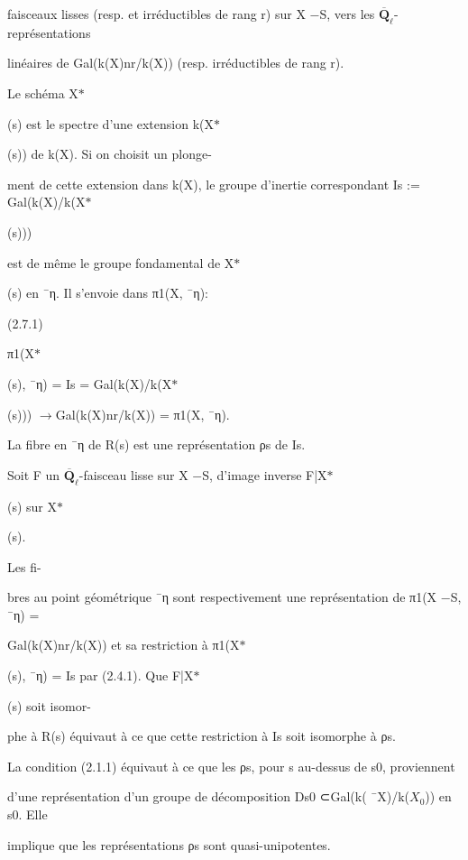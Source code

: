 \documentclass[11pt]{article}
\begin{document}
\noindent faisceaux lisses (resp. et irréductibles de rang r) sur X −S, vers les \(\overline{\mathbf Q}_{\ell}\)-représentations\par
\noindent linéaires de Gal(k(X)nr/k(X)) (resp. irréductibles de rang r).\par
\noindent Le schéma X\(*\)\par
\noindent (s) est le spectre d’une extension k(X\(*\)\par
\noindent (s)) de k(X). Si on choisit un plonge-\par
\noindent ment de cette extension dans k(X), le groupe d’inertie correspondant Is := Gal(k(X)/k(X\(*\)\par
\noindent (s)))\par
\noindent est de même le groupe fondamental de X\(*\)\par
\noindent (s) en ¯η. Il s’envoie dans π1(X, ¯η):\par
\noindent (2.7.1)\par
\noindent π1(X\(*\)\par
\noindent (s), ¯η) = Is = Gal(k(X)/k(X\(*\)\par
\noindent (s))) \(\to\)Gal(k(X)nr/k(X)) = π1(X, ¯η).\par
\noindent La fibre en ¯η de R(s) est une représentation ρs de Is.\par
\noindent Soit F un \(\overline{\mathbf Q}_{\ell}\)-faisceau lisse sur X −S, d’image inverse F|X\(*\)\par
\noindent (s) sur X\(*\)\par
\noindent (s).\par
\noindent Les fi-\par
\noindent bres au point géométrique ¯η sont respectivement une représentation de π1(X −S, ¯η) =\par
\noindent Gal(k(X)nr/k(X)) et sa restriction à π1(X\(*\)\par
\noindent (s), ¯η) = Is par (2.4.1). Que F|X\(*\)\par
\noindent (s) soit isomor-\par
\noindent phe à R(s) équivaut à ce que cette restriction à Is soit isomorphe à ρs.\par
\noindent La condition (2.1.1) équivaut à ce que les ρs, pour s au-dessus de s0, proviennent\par
\noindent d’une représentation d’un groupe de décomposition Ds0 ⊂Gal(k( ¯X)/k(\(X_0\))) en s0. Elle\par
\noindent implique que les représentations ρs sont quasi-unipotentes.\par
\end{document}
